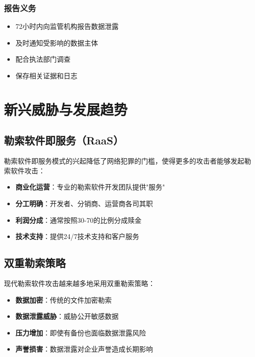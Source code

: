 \documentclass[12pt,a4paper]{article}
\begin{document}
\subsubsection{报告义务}
\begin{itemize}
    \item 72小时内向监管机构报告数据泄露
    \item 及时通知受影响的数据主体
    \item 配合执法部门调查
    \item 保存相关证据和日志
\end{itemize}

\section{新兴威胁与发展趋势}

\subsection{勒索软件即服务（RaaS）}

勒索软件即服务模式的兴起降低了网络犯罪的门槛，使得更多的攻击者能够发起勒索软件攻击：

\begin{itemize}
    \item \textbf{商业化运营}：专业的勒索软件开发团队提供"服务"
    \item \textbf{分工明确}：开发者、分销商、运营商各司其职
    \item \textbf{利润分成}：通常按照30-70的比例分成赎金
    \item \textbf{技术支持}：提供24/7技术支持和客户服务
\end{itemize}

\subsection{双重勒索策略}

现代勒索软件攻击越来越多地采用双重勒索策略：

\begin{itemize}
    \item \textbf{数据加密}：传统的文件加密勒索
    \item \textbf{数据泄露威胁}：威胁公开敏感数据
    \item \textbf{压力增加}：即使有备份也面临数据泄露风险
    \item \textbf{声誉损害}：数据泄露对企业声誉造成长期影响
\end{itemize}
\end{document}
